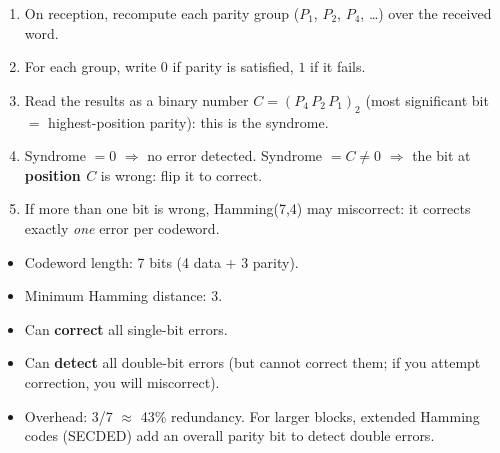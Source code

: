 \documentclass[11pt]{article}
\newcommand{\cle}[1]{{\popxbold\color{popdark}#1}}
\begin{document}
\begin{methode}
\begin{enumerate}
\item On reception, recompute each parity group ($P_1$, $P_2$, $P_4$, \dots) over the received word.
\item For each group, write $0$ if parity is satisfied, $1$ if it fails.
\item Read the results as a binary number $C = (P_4\,P_2\,P_1)_2$ (most significant bit $=$ highest-position parity): this is the \cle{syndrome}.
\item Syndrome $= 0$ $\Rightarrow$ no error detected. Syndrome $= C \neq 0$ $\Rightarrow$ the bit at \textbf{position $C$} is wrong: flip it to correct.
\item If more than one bit is wrong, Hamming(7,4) may miscorrect: it corrects exactly \emph{one} error per codeword.
\end{enumerate}
\end{methode}

\begin{aretenir}
\begin{itemize}
\item Codeword length: 7 bits (4 data + 3 parity).
\item Minimum Hamming distance: 3.
\item Can \textbf{correct} all single-bit errors.
\item Can \textbf{detect} all double-bit errors (but cannot correct them; if you attempt correction, you will miscorrect).
\item Overhead: 3/7 $\approx$ 43\% redundancy. For larger blocks, extended Hamming codes (SECDED) add an overall parity bit to detect double errors.
\end{itemize}
\end{aretenir}
\end{document}
